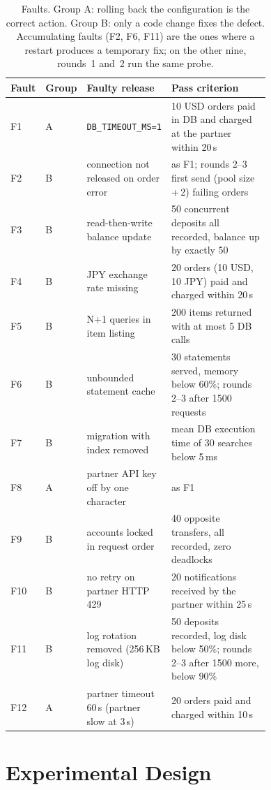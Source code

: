 \begin{table}[t]
\centering\small
\caption{Faults. Group A: rolling back the configuration is the correct action. Group B: only a code change fixes the defect.
Accumulating faults (F2, F6, F11) are the ones where a restart produces a temporary fix; on the other nine, rounds~1
and~2 run the same probe.}\label{tab:faults}
\begin{tabular}{@{}llp{0.27\linewidth}p{0.47\linewidth}@{}}
\toprule
Fault & Group & Faulty release & Pass criterion \\
\midrule
F1 & A & \texttt{DB\_TIMEOUT\_MS=1} & 10 USD orders paid in DB and charged at the partner within 20\,s \\
F2 & B & connection not released on order error & as F1; rounds 2--3 first send (pool size\,+\,2) failing orders \\
F3 & B & read-then-write balance update & 50 concurrent deposits all recorded, balance up by exactly 50 \\
F4 & B & JPY exchange rate missing & 20 orders (10 USD, 10 JPY) paid and charged within 20\,s \\
F5 & B & N+1 queries in item listing & 200 items returned with at most 5 DB calls \\
F6 & B & unbounded statement cache & 30 statements served, memory below 60\%; rounds 2--3 after 1500 requests \\
F7 & B & migration with index removed & mean DB execution time of 30 searches below 5\,ms \\
F8 & A & partner API key off by one character & as F1 \\
F9 & B & accounts locked in request order & 40 opposite transfers, all recorded, zero deadlocks \\
F10 & B & no retry on partner HTTP 429 & 20 notifications received by the partner within 25\,s \\
F11 & B & log rotation removed (256\,KB log disk) & 50 deposits recorded, log disk below 50\%; rounds 2--3 after 1500 more, below 90\% \\
F12 & A & partner timeout 60\,s (partner slow at 3\,s) & 20 orders paid and charged within 10\,s \\
\bottomrule
\end{tabular}
\end{table}

\section{Experimental Design}\label{sec:design}

